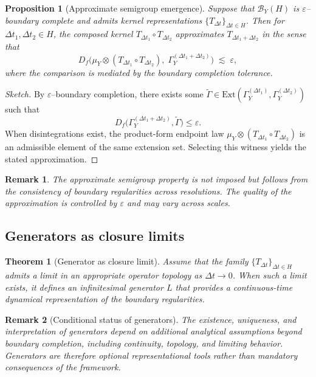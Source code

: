 \documentclass[11pt]{article}
\newtheorem{proposition}{Proposition}
\newtheorem{theorem}{Theorem}
\newtheorem{remark}{Remark}
\newcommand{\Ext}{\mathrm{Ext}} 	%
\begin{document}
\begin{proposition}[Approximate semigroup emergence]\label{prop:approx-semigroup}
Suppose that $\mathcal B_Y(H)$ is $\varepsilon$--boundary complete and admits kernel
representations $\{T_{\Delta t}\}_{\Delta t\in H}$. Then for $\Delta t_1,\Delta t_2\in H$,
the composed kernel $T_{\Delta t_1}\circ T_{\Delta t_2}$ approximates $T_{\Delta t_1+\Delta t_2}$
in the sense that
\[
D_f\!\Big(
\mu_Y \otimes (T_{\Delta t_1}\circ T_{\Delta t_2}),\;
\Gamma_Y^{(\Delta t_1+\Delta t_2)}
\Big)
\;\lesssim\;
\varepsilon,
\]
where the comparison is mediated by the boundary completion tolerance.
\end{proposition}

\begin{proof}[Sketch]
By $\varepsilon$--boundary completion, there exists some
$\widetilde\Gamma\in
\Ext(\Gamma_Y^{(\Delta t_1)},\Gamma_Y^{(\Delta t_2)})$
such that
\[
D_f\!\Big(
\Gamma_Y^{(\Delta t_1+\Delta t_2)},\widetilde\Gamma
\Big)\le \varepsilon.
\]
When disintegrations exist, the product-form endpoint law
$\mu_Y\otimes(T_{\Delta t_1}\circ T_{\Delta t_2})$ is an admissible element of the same extension
set. Selecting this witness yields the stated approximation.
\end{proof}

\begin{remark}
The approximate semigroup property is not imposed but follows from the consistency of boundary
regularities across resolutions. The quality of the approximation is controlled by $\varepsilon$
and may vary across scales.
\end{remark}

\subsection{Generators as closure limits}

\begin{theorem}[Generator as closure limit]\label{thm:generator-limit}
Assume that the family $\{T_{\Delta t}\}_{\Delta t\in H}$ admits a limit in an appropriate operator
topology as $\Delta t\to 0$. When such a limit exists, it defines an infinitesimal generator $L$
that provides a continuous-time dynamical representation of the boundary regularities.
\end{theorem}

\begin{remark}[Conditional status of generators]
The existence, uniqueness, and interpretation of generators depend on additional analytical
assumptions beyond boundary completion, including continuity, topology, and limiting behavior.
Generators are therefore optional representational tools rather than mandatory consequences of
the framework.
\end{remark}
\end{document}
